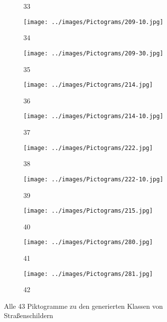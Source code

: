 \begin{figure}[H]
\begin{subfigure}[b]{0.1\textwidth}
\caption{33}
\end{subfigure}
\hspace{3em}%
\begin{subfigure}[b]{0.1\textwidth}
\centering
\texttt{[image: ../images/Pictograms/209-10.jpg]}
\caption{34}
\end{subfigure}
\hspace{3em}%
\begin{subfigure}[b]{0.1\textwidth}
\centering
\texttt{[image: ../images/Pictograms/209-30.jpg]}
\caption{35}
\end{subfigure}
\hspace{3em}%
\begin{subfigure}[b]{0.1\textwidth}
\centering
\texttt{[image: ../images/Pictograms/214.jpg]}
\caption{36}
\end{subfigure}
\hspace{3em}%
\begin{subfigure}[b]{0.1\textwidth}
\centering
\texttt{[image: ../images/Pictograms/214-10.jpg]}
\caption{37}
\end{subfigure}
\hspace{3em}%
\begin{subfigure}[b]{0.1\textwidth}
\centering
\texttt{[image: ../images/Pictograms/222.jpg]}
\caption{38}
\end{subfigure}
\hspace{3em}%
\begin{subfigure}[b]{0.1\textwidth}
\centering
\texttt{[image: ../images/Pictograms/222-10.jpg]}
\caption{39}
\end{subfigure}
\hspace{3em}%
\begin{subfigure}[b]{0.1\textwidth}
\centering
\texttt{[image: ../images/Pictograms/215.jpg]}
\caption{40}
\end{subfigure}
\hspace{3em}%
\begin{subfigure}[b]{0.1\textwidth}
\centering
\texttt{[image: ../images/Pictograms/280.jpg]}
\caption{41}
\end{subfigure}
\hspace{3em}%
\begin{subfigure}[b]{0.1\textwidth}
\centering
\texttt{[image: ../images/Pictograms/281.jpg]}
\caption{42}
\end{subfigure}
      \caption{Alle 43 Piktogramme zu den generierten Klassen von Straßenschildern \cite{piktogramme}}
      \label{fig:all-pictograms}
\end{figure}

